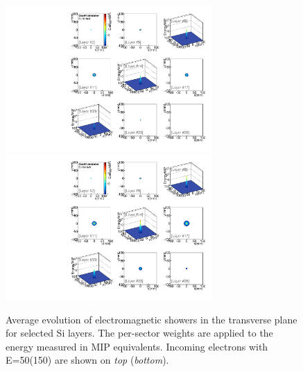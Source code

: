 \begin{figure}[h!]
  \begin{center}
    \includegraphics[width=0.7\textwidth]{figures/cxysensorenhitsvsrE50}
    \includegraphics[width=0.7\textwidth]{figures/cxysensorenhitsvsrE150}
    \caption{Average evolution of electromagnetic showers in the transverse
      plane for selected Si layers. The per-sector weights are applied
      to the energy measured in MIP equivalents. Incoming electrons
      with E=50\GeV (150\GeV) are shown on {\em top} ({\em bottom}).
   }
    \label{fig:showertrans}
  \end{center}
\end{figure}

